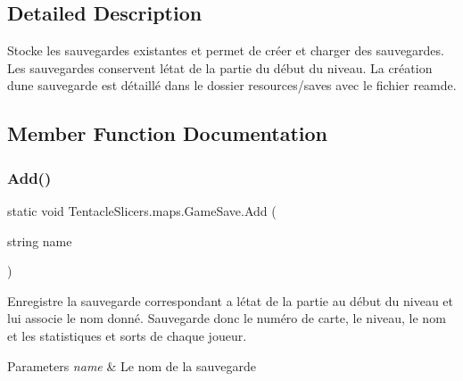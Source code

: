 \subsection{Detailed Description}
Stocke les sauvegardes existantes et permet de créer et charger des sauvegardes. Les sauvegardes conservent l\textquotesingle{}état de la partie du début du niveau. La création d\textquotesingle{}une sauvegarde est détaillé dans le dossier resources/saves avec le fichier reamde. 



\subsection{Member Function Documentation}
\mbox{\label{class_tentacle_slicers_1_1maps_1_1_game_save_ad3b968abab5f585683e076a6d4725d4f}} 
\subsubsection{\texorpdfstring{Add()}{Add()}}
{\footnotesize\ttfamily static void Tentacle\+Slicers.\+maps.\+Game\+Save.\+Add (\begin{DoxyParamCaption}\item[{string}]{name }\end{DoxyParamCaption})\hspace{0.3cm}{\ttfamily [static]}}



Enregistre la sauvegarde correspondant a l\textquotesingle{}état de la partie au début du niveau et lui associe le nom donné. Sauvegarde donc le numéro de carte, le niveau, le nom et les statistiques et sorts de chaque joueur. 


\begin{DoxyParams}{Parameters}
{\em name} & Le nom de la sauvegarde \\
\hline
\end{DoxyParams}
\mbox{\label{class_tentacle_slicers_1_1maps_1_1_game_save_a49db144314552baaa5cb4b3cf99544c4}} 
